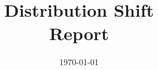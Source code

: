 \documentclass[a4paper,12pt]{report}
\institute{UniTs - University of Trieste}
\title{Distribution Shift\\Report}
\date{\today}
\begin{document}
\maketitle



\toc


\printbibliography
\end{document}
